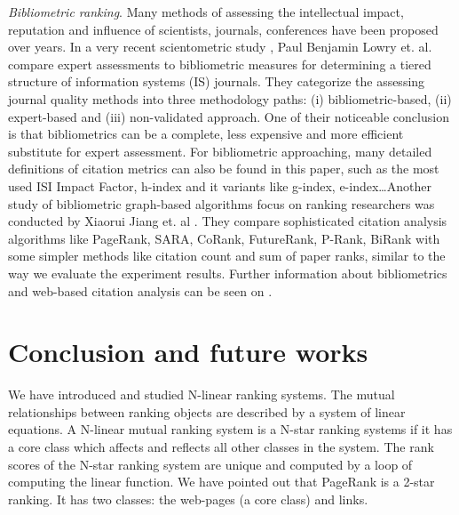 \documentclass[10pt,leqno,twoside]{article}
\begin{document}
\textit{Bibliometric ranking}. 
Many methods of assessing the intellectual impact, reputation and influence of scientists, journals, conferences have been proposed over years. In a very recent scientometric study \cite{EvaluatingJournal}, Paul Benjamin Lowry et. al. compare expert assessments to bibliometric measures for determining a tiered structure of information systems (IS) journals. They categorize the assessing journal quality methods into three methodology paths: (i) bibliometric-based, (ii) expert-based and  (iii) non-validated approach.
One of their noticeable conclusion is that bibliometrics can be a complete, less expensive and more efficient substitute for expert assessment. For bibliometric approaching, many detailed definitions of citation metrics can also be found in this paper, such as the most used ISI Impact Factor, h-index and it variants like g-index, e-index\ldots Another study of bibliometric graph-based algorithms focus on ranking researchers was conducted by Xiaorui Jiang et. al \cite{Graphbased}. They compare sophisticated citation analysis algorithms like PageRank, SARA, CoRank, FutureRank, P-Rank, BiRank with some simpler methods like citation count and sum of paper ranks, similar to the way we evaluate the experiment results. Further information about bibliometrics and web-based citation analysis can be seen on \cite{Cronin-JIS-01}.  

\section{Conclusion and future works}\label{Sect:Conclusion}
We have introduced and studied N-linear ranking systems. The mutual relationships between ranking objects are described by a system of linear equations. A N-linear mutual ranking system is a N-star ranking systems if it has a core class which affects and reflects all other classes in the system. The rank scores of the N-star ranking system are unique and computed by a loop of computing the linear function. We have pointed out that PageRank is a 2-star ranking. It has two classes:  the web-pages (a core class) and links.
\end{document}
